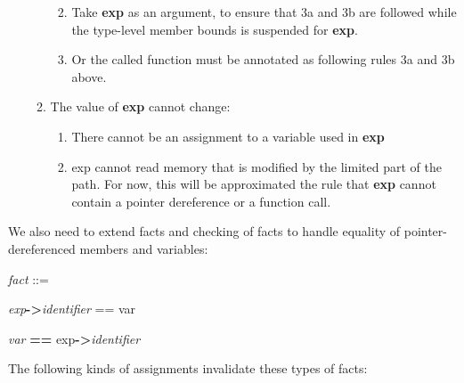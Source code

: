 \documentclass[]{article}
\begin{document}
\begin{enumerate}
\begin{enumerate}
    \begin{enumerate}
    \def\labelenumiii{\roman{enumiii}.}
    \item
      Take \textbf{exp} as an argument, to ensure that 3a and 3b are
      followed while the type-level member bounds is suspended for
      \textbf{exp}.
    \item
      Or the called function must be annotated as following rules 3a and
      3b above.
    \end{enumerate}
  \item
    The value of \textbf{exp} cannot change:

    \begin{enumerate}
    \def\labelenumiii{\roman{enumiii}.}
    \item
      There cannot be an assignment to a variable used in \textbf{exp}
    \item
      exp cannot read memory that is modified by the limited part of the
      path. For now, this will be approximated the rule that
      \textbf{exp} cannot contain a pointer dereference or a function
      call.
    \end{enumerate}
  \end{enumerate}
\end{enumerate}

We also need to extend facts and checking of facts to handle equality of
pointer-dereferenced members and variables:

\emph{fact} ::=

\emph{exp}\textbf{-\textgreater{}}\emph{identifier} == var

\emph{var} \textbf{==} exp\textbf{-\textgreater{}}\emph{identifier}

The following kinds of assignments invalidate these types of facts:
\end{document}
